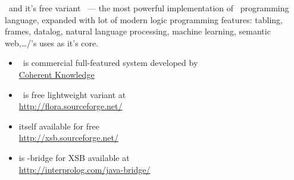 \secrel{\ergo/\flora}\secdown

\ergo\ and it's free variant \flora\ --- the most powerful implementation of
\prolog\ programming language, expanded with lot of modern logic programming
features: tabling, frames, datalog, natural language processing, machine
learning, semantic web,\ldots \ergo/\flora's uses  as it's
core.

\begin{itemize}[nosep]
  \item \ergo\ is commercial full-featured system developed by\\
  \href{http://coherentknowledge.com/product-overview-ergo-suite-platform/}{Coherent
  Knowledge}
  \item \flora\ is free lightweight variant at\\
  \url{http://flora.sourceforge.net/}
  \item {} itself available for free\\
  \url{http://xsb.sourceforge.net/}
  \item {} is \java-bridge for XSB available at\\
  \url{http://interprolog.com/java-bridge/}
\end{itemize}

\secup
